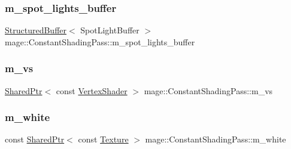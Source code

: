 \subsubsection{\texorpdfstring{m\+\_\+spot\+\_\+lights\+\_\+buffer}{m\_spot\_lights\_buffer}}
{\footnotesize\ttfamily \hyperlink{structmage_1_1_structured_buffer}{Structured\+Buffer}$<$ Spot\+Light\+Buffer $>$ mage\+::\+Constant\+Shading\+Pass\+::m\+\_\+spot\+\_\+lights\+\_\+buffer\hspace{0.3cm}{\ttfamily [private]}}

\hypertarget{classmage_1_1_constant_shading_pass_a3dc25d352bc4b9dcf9b06993e2e46c62}{}\label{classmage_1_1_constant_shading_pass_a3dc25d352bc4b9dcf9b06993e2e46c62} 
\subsubsection{\texorpdfstring{m\+\_\+vs}{m\_vs}}
{\footnotesize\ttfamily \hyperlink{namespacemage_a1e01ae66713838a7a67d30e44c67703e}{Shared\+Ptr}$<$ const \hyperlink{classmage_1_1_vertex_shader}{Vertex\+Shader} $>$ mage\+::\+Constant\+Shading\+Pass\+::m\+\_\+vs\hspace{0.3cm}{\ttfamily [private]}}

\hypertarget{classmage_1_1_constant_shading_pass_aa5c9222b0de16e351b90752150d584d1}{}\label{classmage_1_1_constant_shading_pass_aa5c9222b0de16e351b90752150d584d1} 
\subsubsection{\texorpdfstring{m\+\_\+white}{m\_white}}
{\footnotesize\ttfamily const \hyperlink{namespacemage_a1e01ae66713838a7a67d30e44c67703e}{Shared\+Ptr}$<$ const \hyperlink{classmage_1_1_texture}{Texture} $>$ mage\+::\+Constant\+Shading\+Pass\+::m\+\_\+white\hspace{0.3cm}{\ttfamily [private]}}

